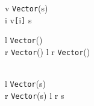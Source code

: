       {\Gamma \vdash v \Rightarrow \texttt{Vector}(s) \\ \Gamma \vdash i \Rightarrow {}}
      {\Gamma \vdash v\texttt{[}i\texttt{]} \Rightarrow s}


      {\Gamma \vdash l \Rightarrow \texttt{Vector}() \\ \Gamma \vdash r \Rightarrow \texttt{Vector}()}
      {\Gamma \vdash l \times r \Rightarrow \texttt{Vector}()}


      { \\ \Gamma \vdash l \Rightarrow \texttt{Vector}(s) \\ \Gamma \vdash r \Rightarrow \texttt{Vector}(s)}
      {\Gamma \vdash l \cdot{} r \Rightarrow s}


